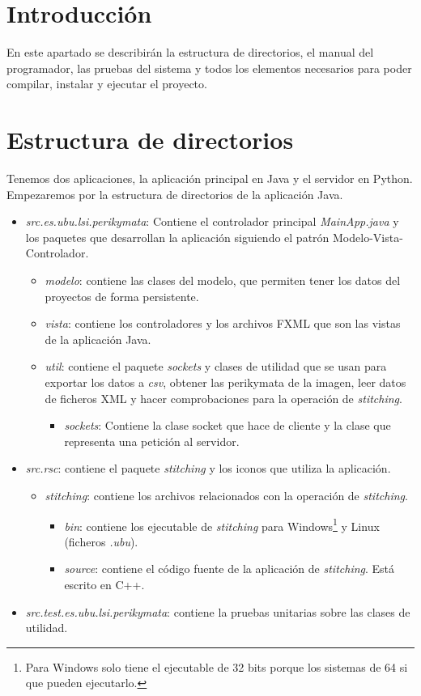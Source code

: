 
\section{Introducción}
En este apartado se describirán la estructura de directorios, el manual del programador, las pruebas del sistema y todos los elementos necesarios para poder compilar, instalar y ejecutar el proyecto.
\section{Estructura de directorios}
Tenemos dos aplicaciones, la aplicación principal en Java y el servidor en Python. Empezaremos por la estructura de directorios de la aplicación Java. 
\begin{itemize}
    \item \textit{src.es.ubu.lsi.perikymata}: Contiene el controlador principal \textit{MainApp.java} y los paquetes que desarrollan la aplicación siguiendo el patrón Modelo-Vista-Controlador.
    \begin{itemize}
        \item \textit{modelo}: contiene las clases del modelo, que permiten tener los datos del proyectos de forma persistente.
        \item \textit{vista}: contiene los controladores y los archivos FXML que son las vistas de la aplicación Java.
        \item \textit{util}: contiene el paquete \textit{sockets} y clases de utilidad que se usan para exportar los datos a \textit{csv}, obtener las perikymata de la imagen, leer datos de ficheros XML y hacer comprobaciones para la operación de \textit{stitching}.
        \begin{itemize}
            \item \textit{sockets}: Contiene la clase socket que hace de cliente y la clase que representa una petición al servidor.
        \end{itemize}
    \end{itemize}
    \item \textit{src.rsc}: contiene el paquete \textit{stitching} y los iconos que utiliza la aplicación.
    \begin{itemize}
        \item \textit{stitching}: contiene los archivos relacionados con la operación de \textit{stitching}.
        \begin{itemize}
        \item \textit{bin}: contiene los ejecutable de \textit{stitching} para Windows\footnote{Para Windows solo tiene el ejecutable de 32 bits porque los sistemas de 64 si que pueden ejecutarlo.} y Linux (ficheros \textit{.ubu}).
        \item \textit{source}: contiene el código fuente de la aplicación de \textit{stitching}. Está escrito en C++.
    \end{itemize}
    \end{itemize}    
    \item \textit{src.test.es.ubu.lsi.perikymata}: contiene la pruebas unitarias sobre las clases de utilidad.
\end{itemize}

